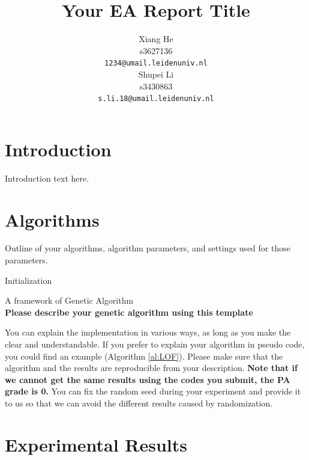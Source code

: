 \documentclass{article}
\title{Your EA Report Title}
\author{
 Xiang He\\
  s3627136\\
  \texttt{1234@umail.leidenuniv.nl}\\
   \And
 Shupei Li\\
  s3430863\\
  \texttt{s.li.18@umail.leidenuniv.nl} \\
}
\newcommand{\note}[1]{\textbf{#1}}
\begin{document}
\maketitle




\section{Introduction}\label{sec:intro}

Introduction text here.

\section{Algorithms}
\label{sec:imple}

Outline of your algorithms, algorithm parameters, and settings used for those parameters. 

\begin{algorithm}[!ht]
\SetAlgoLined
{}

\BlankLine

Initialization\;

\caption{A framework of Genetic Algorithm \\\note{Please describe your genetic algorithm using this template}}\label{al:LOF}
\end{algorithm}
 
You can explain the implementation in various ways, as long as you make the clear and understandable. If you prefer to explain your algorithm in pseudo code, you could find an example (Algorithm \ref{al:LOF}). Please make sure that the algorithm and the results are reproducible from your description. \note{Note that if we cannot get the same results using the codes you submit, the PA grade is 0.} You can fix the random seed during your experiment and provide it to us so that we can avoid the different results caused by randomization. 




\section{Experimental Results}\label{sec:experi}
\end{document}

